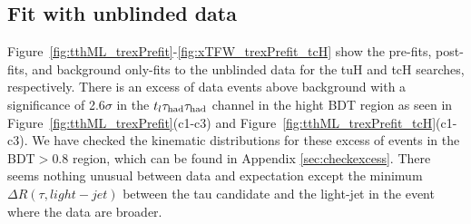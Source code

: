 








\subsection{Fit with unblinded data}
\label{sec:fit_data}

Figure~\ref{fig:tthML_trexPrefit}-\ref{fig:xTFW_trexPrefit_tcH} show the pre-fits, post-fits, and background only-fits to the unblinded data for the tuH and tcH searches, respectively.
There is an excess of data events above background with a significance of 2.6$\sigma$ in the $t_l\tau_\text{had}{}\tau_\text{had}$ channel in the hight BDT region as seen in Figure~\ref{fig:tthML_trexPrefit}(c1-c3) and Figure~\ref{fig:tthML_trexPrefit_tcH}(c1-c3). We have checked the kinematic distributions for these excess of events in
the BDT$>0.8$ region, which can be found in Appendix \ref{sec:checkexcess}.  There seems nothing unusual between data and expectation except the
minimum $\Delta R(\tau, light-jet)$ between the tau candidate and the light-jet in the event where the data are broader. 

